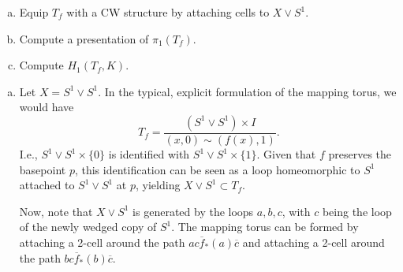 \documentclass[twoside, titlepage]{amsart}
\makeatletter
\theoremstyle{plain} %
\theoremstyle{definition}
\theoremstyle{remark}
\theoremstyle{notation}
\renewenvironment{proof}[1][\proofname]{\par
	\pushQED{\qed}%
	\normalfont \topsep6\p@\@plus6\p@\relax
	\trivlist
	\item\relax
	{\itshape
		#1\@addpunct{.}}\hspace\labelsep\ignorespaces
}{%
\popQED\endtrivlist\@endpefalse
}
\newcommand{\inv}[1]{\overline{#1}}
\makeatother
\begin{document}
	\begin{enumerate}[(a)]
		\item Equip $T_f$ with a CW structure by attaching cells to $X \vee S^1$.
		\item Compute a presentation of $\pi_1(T_f)$. 
		\item Compute $H_1(T_f,K)$.
	\end{enumerate}
	
	\begin{proof}
		
		\begin{enumerate}[(a)]
			\item Let $X = S^1 \vee S^1$.  In the typical, explicit formulation of the mapping torus, we would have
			$$T_f = \frac{(S^1 \vee S^1) \times I}{(x,0) \sim (f(x),1)}.$$
			I.e., $S^1 \vee S^1 \times \{0\}$ is identified with $S^1 \vee S^1 \times \{1\}$.  Given that $f$ preserves the basepoint $p$, this identification can be seen as a loop homeomorphic to $S^1$ attached to $S^1 \vee S^1$ at $p$, yielding $X \vee S^1 \subset T_f$.
			
			Now, note that $X \vee S^1$ is generated by the loops $a,b,c$, with $c$ being the loop of the newly wedged copy of $S^1$.  The mapping torus can be formed by attaching a 2-cell around the path $a c \inv{f}_*(a) \inv{c}$ and attaching a 2-cell around the path $b c \inv{f}_*(b) \inv{c}$.
			

\end{enumerate}
\end{proof}
\end{document}
